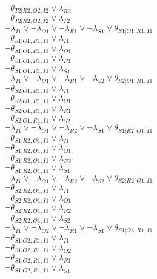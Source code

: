 $\neg\theta_{T2|R2,O2,I2} \vee \lambda_{R2}$\\
$\neg\theta_{T2|R2,O2,I2} \vee \lambda_{T2}$\\
$\neg\lambda_{I1} \vee \neg\lambda_{O1} \vee \neg\lambda_{R1} \vee \neg\lambda_{S1} \vee \theta_{S1|O1,R1,I1}$\\
$\neg\theta_{S1|O1,R1,I1} \vee \lambda_{I1}$\\
$\neg\theta_{S1|O1,R1,I1} \vee \lambda_{O1}$\\
$\neg\theta_{S1|O1,R1,I1} \vee \lambda_{R1}$\\
$\neg\theta_{S1|O1,R1,I1} \vee \lambda_{S1}$\\
$\neg\lambda_{I1} \vee \neg\lambda_{O1} \vee \neg\lambda_{R1} \vee \neg\lambda_{S2} \vee \theta_{S2|O1,R1,I1}$\\
$\neg\theta_{S2|O1,R1,I1} \vee \lambda_{I1}$\\
$\neg\theta_{S2|O1,R1,I1} \vee \lambda_{O1}$\\
$\neg\theta_{S2|O1,R1,I1} \vee \lambda_{R1}$\\
$\neg\theta_{S2|O1,R1,I1} \vee \lambda_{S2}$\\
$\neg\lambda_{I1} \vee \neg\lambda_{O1} \vee \neg\lambda_{R2} \vee \neg\lambda_{S1} \vee \theta_{S1|R2,O1,I1}$\\
$\neg\theta_{S1|R2,O1,I1} \vee \lambda_{I1}$\\
$\neg\theta_{S1|R2,O1,I1} \vee \lambda_{O1}$\\
$\neg\theta_{S1|R2,O1,I1} \vee \lambda_{R2}$\\
$\neg\theta_{S1|R2,O1,I1} \vee \lambda_{S1}$\\
$\neg\lambda_{I1} \vee \neg\lambda_{O1} \vee \neg\lambda_{R2} \vee \neg\lambda_{S2} \vee \theta_{S2|R2,O1,I1}$\\
$\neg\theta_{S2|R2,O1,I1} \vee \lambda_{I1}$\\
$\neg\theta_{S2|R2,O1,I1} \vee \lambda_{O1}$\\
$\neg\theta_{S2|R2,O1,I1} \vee \lambda_{R2}$\\
$\neg\theta_{S2|R2,O1,I1} \vee \lambda_{S2}$\\
$\neg\lambda_{I1} \vee \neg\lambda_{O2} \vee \neg\lambda_{R1} \vee \neg\lambda_{S1} \vee \theta_{S1|O2,R1,I1}$\\
$\neg\theta_{S1|O2,R1,I1} \vee \lambda_{I1}$\\
$\neg\theta_{S1|O2,R1,I1} \vee \lambda_{O2}$\\
$\neg\theta_{S1|O2,R1,I1} \vee \lambda_{R1}$\\
$\neg\theta_{S1|O2,R1,I1} \vee \lambda_{S1}$\\
